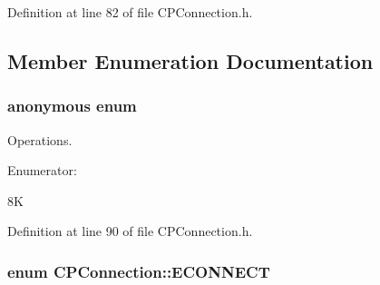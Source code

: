 \-Definition at line 82 of file \-C\-P\-Connection.\-h.



\subsection{\-Member \-Enumeration \-Documentation}
\hypertarget{class_c_p_connection_a806d0ccf9284ab6cfa8f9f638df5b8e5}{\subsubsection[{anonymous enum}]{\setlength{\rightskip}{0pt plus 5cm}anonymous enum}}\label{class_c_p_connection_a806d0ccf9284ab6cfa8f9f638df5b8e5}


\-Operations. 

\begin{Desc}
\item[\-Enumerator\-: ]\par
\begin{description}
\item[{\em 
\hypertarget{class_c_p_connection_a806d0ccf9284ab6cfa8f9f638df5b8e5a212b310ed9516ad4edce81eb3f615a90}{\-C\-S\-\_\-\-B\-U\-F\-F\-E\-R\-\_\-\-S\-I\-Z\-E}\label{class_c_p_connection_a806d0ccf9284ab6cfa8f9f638df5b8e5a212b310ed9516ad4edce81eb3f615a90}
}]\item[{\em 
\hypertarget{class_c_p_connection_a806d0ccf9284ab6cfa8f9f638df5b8e5ae1bfa53acfedd84586f9577402592e70}{\-C\-S\-\_\-\-O\-U\-T\-B\-U\-F\-F\-E\-R\-\_\-\-S\-I\-Z\-E}\label{class_c_p_connection_a806d0ccf9284ab6cfa8f9f638df5b8e5ae1bfa53acfedd84586f9577402592e70}
}]8\-K \end{description}
\end{Desc}



\-Definition at line 90 of file \-C\-P\-Connection.\-h.

\hypertarget{class_c_p_connection_a0b9dfdba3bf3fb022507756c5eff7bde}{
\subsubsection[{\-E\-C\-O\-N\-N\-E\-C\-T}]{\setlength{\rightskip}{0pt plus 5cm}enum {\bf \-C\-P\-Connection\-::\-E\-C\-O\-N\-N\-E\-C\-T}}}\label{class_c_p_connection_a0b9dfdba3bf3fb022507756c5eff7bde}


